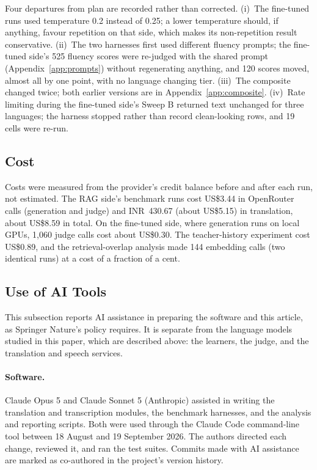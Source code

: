 \documentclass[pdflatex,sn-mathphys-num]{sn-jnl}%
\theoremstyle{thmstyleone}%
\theoremstyle{thmstyletwo}%
\theoremstyle{thmstylethree}%
\begin{document}
Four departures from plan are recorded rather than corrected. (i)~The fine-tuned runs used
temperature 0.2 instead of 0.25; a lower temperature should, if anything, favour repetition on that
side, which makes its non-repetition result conservative. (ii)~The two harnesses first used different
fluency prompts; the fine-tuned side's 525 fluency scores were re-judged with the shared prompt
(Appendix~\ref{app:prompts}) without regenerating anything, and 120 scores moved, almost all by one
point, with no language changing tier. (iii)~The composite changed twice; both earlier versions are in
Appendix~\ref{app:composite}. (iv)~Rate limiting during the fine-tuned side's Sweep B returned text
unchanged for three languages; the harness stopped rather than record clean-looking rows, and 19 cells
were re-run.

\subsection{Cost}\label{sec:cost}

Costs were measured from the provider's credit balance before and after each run, not estimated.
The RAG side's benchmark runs cost US\$3.44 in OpenRouter calls (generation and judge) and INR~430.67
(about US\$5.15) in translation, about US\$8.59 in total. On the fine-tuned side, where generation runs
on local GPUs, 1,060 judge calls cost about US\$0.30. The teacher-history experiment cost US\$0.89, and
the retrieval-overlap analysis made 144 embedding calls (two identical runs) at a cost of a fraction
of a cent.

\subsection{Use of AI Tools}\label{sec:ai-use}

This subsection reports AI assistance in preparing the software and this article, as Springer
Nature's policy requires. It is separate from the language models studied in this paper, which are
described above: the learners, the judge, and the translation and speech services.

\paragraph{Software.} Claude Opus 5 and Claude Sonnet 5 (Anthropic) assisted in writing the
translation and transcription modules, the benchmark harnesses, and the analysis and reporting
scripts. Both were used through the Claude Code command-line tool between 18 August and 19 September
2026. The authors directed each change, reviewed it, and ran the test suites. Commits made with AI
assistance are marked as co-authored in the project's version history.
\end{document}
